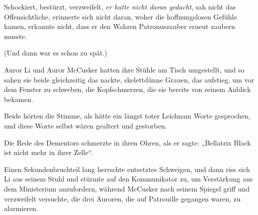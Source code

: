 Schockiert, bestürzt, verzweifelt, \emph{er hatte nicht daran gedacht}, sah nicht das Offensichtliche, erinnerte sich nicht daran, woher die hoffnungslosen Gefühle kamen, erkannte nicht, dass er den Wahren Patronuszauber erneut zaubern musste.

(Und dann war es schon zu spät.)

\later

Auror Li und Auror McCusker hatten ihre Stühle am Tisch umgestellt, und so sahen sie beide gleichzeitig das nackte, skelettdünne Grauen, das aufstieg, um vor dem Fenster zu schweben, die Kopfschmerzen, die sie bereits von seinem Anblick bekamen.

Beide hörten die Stimme, als hätte ein längst toter Leichnam Worte gesprochen, und diese Worte selbst wären gealtert und gestorben.

Die Rede des Dementors schmerzte in ihren Ohren, als er sagte: „Bellatrix Black ist nicht mehr in ihrer Zelle“.

Einen Sekundenbruchteil lang herrschte entsetztes Schweigen, und dann riss sich Li aus seinem Stuhl und stürmte auf den Kommunikator zu, um Verstärkung aus dem Ministerium anzufordern, während McCusker nach seinem Spiegel griff und verzweifelt versuchte, die drei Auroren, die auf Patrouille gegangen waren, zu alarmieren.

